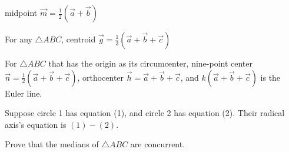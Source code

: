 \documentclass[11pt]{scrartcl}
\begin{document}
\begin{fact} \label{midpoint}
  midpoint $\vec{m}=\frac{1}{2}(\vec{a}+\vec{b})$
\end{fact}
\begin{fact} \label{centroid}
  For any $\triangle ABC$, centroid 
  $\vec{g}=\frac{1}{3}(\vec{a}+\vec{b}+\vec{c})$
\end{fact}
\begin{fact} \label{euler line}
  For $\triangle ABC$ that has the origin as its circumcenter,
  nine-point center $\vec{n}=\frac{1}{2}(\vec{a}+\vec{b}+\vec{c})$,
  orthocenter $\vec{h}=\vec{a}+\vec{b}+\vec{c}$, and 
  $k(\vec{a}+\vec{b}+\vec{c})$ is the Euler line.
\end{fact}
\begin{fact}
  Suppose circle 1 has equation (1), and circle 2 has equation (2). Their radical axis's equation is $(1)-(2)$.
\end{fact}
\begin{example} 
  Prove that the medians of $\triangle ABC$ are concurrent.
\end{example}
\end{document}
